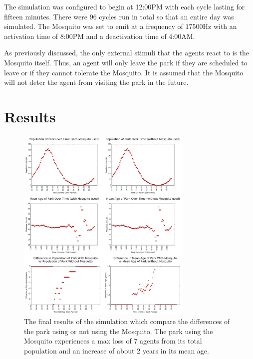 \documentclass[twocolumn,11pt]{article}
\begin{document}
The simulation was configured to begin at 12:00PM with each cycle lasting for fifteen minutes. There were $96$ cycles run in total so that an entire day was simulated. The Mosquito was set to emit at a frequency of $17500$Hz with an activation time of 8:00PM and a deactivation time of 4:00AM.

As previously discussed, the only external stimuli that the agents react to is the Mosquito itself. Thus, an agent will only leave the park if they are scheduled to leave or if they cannot tolerate the Mosquito. It is assumed that the Mosquito will not deter the agent from visiting the park in the future.

\section*{Results}

\begin{figure}[t!]
    \centering
    \includegraphics[width=0.75\textwidth]{results.png}
    \caption{The final results of the simulation which compare the differences of the park using or not using the Mosquito. The park using the Mosquito experiences a max loss of $7$ agents from its total population and an increase of about $2$ years in its mean age.}
    \label{fig:results}
\end{figure}
\end{document}
